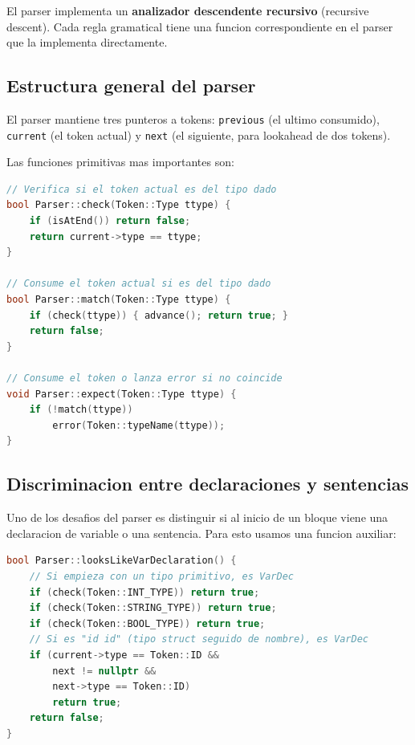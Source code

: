 \documentclass[12pt, a4paper]{article}
\begin{document}
El parser implementa un \textbf{analizador descendente recursivo} (recursive descent). Cada regla gramatical tiene una funcion correspondiente en el parser que la implementa directamente.

\subsection{Estructura general del parser}

El parser mantiene tres punteros a tokens: \texttt{previous} (el ultimo consumido), \texttt{current} (el token actual) y \texttt{next} (el siguiente, para lookahead de dos tokens).

Las funciones primitivas mas importantes son:

\begin{lstlisting}[language=C++, style=cppstyle, caption={Funciones primitivas del parser}]
// Verifica si el token actual es del tipo dado
bool Parser::check(Token::Type ttype) {
    if (isAtEnd()) return false;
    return current->type == ttype;
}

// Consume el token actual si es del tipo dado
bool Parser::match(Token::Type ttype) {
    if (check(ttype)) { advance(); return true; }
    return false;
}

// Consume el token o lanza error si no coincide
void Parser::expect(Token::Type ttype) {
    if (!match(ttype))
        error(Token::typeName(ttype));
}
\end{lstlisting}

\subsection{Discriminacion entre declaraciones y sentencias}

Uno de los desafios del parser es distinguir si al inicio de un bloque viene una declaracion de variable o una sentencia. Para esto usamos una funcion auxiliar:

\begin{lstlisting}[language=C++, style=cppstyle, caption={Deteccion de declaracion de variable}]
bool Parser::looksLikeVarDeclaration() {
    // Si empieza con un tipo primitivo, es VarDec
    if (check(Token::INT_TYPE)) return true;
    if (check(Token::STRING_TYPE)) return true;
    if (check(Token::BOOL_TYPE)) return true;
    // Si es "id id" (tipo struct seguido de nombre), es VarDec
    if (current->type == Token::ID &&
        next != nullptr &&
        next->type == Token::ID)
        return true;
    return false;
}
\end{lstlisting}
\end{document}
